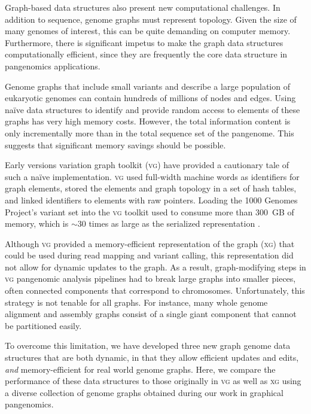 \documentclass{bioinfo}
\begin{document}
Graph-based data structures also present new computational challenges.
In addition to sequence, genome graphs must represent topology.
Given the size of many genomes of interest, this can be quite demanding on computer memory.
Furthermore, there is significant impetus to make the graph data structures computationally efficient, since they are frequently the core data structure in pangenomics applications.

Genome graphs that include small variants and describe a large population of eukaryotic genomes can contain hundreds of millions of nodes and edges.
Using na\"ive data structures to identify and provide random access to elements of these graphs has very high memory costs.
However, the total information content is only incrementally more than in the total sequence set of the pangenome.
This suggests that significant memory savings should be possible.

Early versions variation graph toolkit (\textsc{vg}) \citep{Garrison_2018} have provided a cautionary tale of such a na\"ive implementation.
\textsc{vg} used full-width machine words as identifiers for graph elements, stored the elements and graph topology in a set of hash tables, and linked identifiers to elements with raw pointers.
Loading the 1000 Genomes Project's variant set into the \textsc{vg} toolkit used to consume more than 300~GB of memory, which is $\sim$30 times as large as the serialized representation \citep{Garrison_2019}.

Although \textsc{vg} provided a memory-efficient representation of the graph (\textsc{xg}) that could be used during read mapping and variant calling, this representation did not allow for dynamic updates to the graph.
As a result, graph-modifying steps in \textsc{vg} pangenomic analysis pipelines had to break large graphs into smaller pieces, often connected components that correspond to chromosomes.
Unfortunately, this strategy is not tenable for all graphs.
For instance, many whole genome alignment and assembly graphs consist of a single giant component that cannot be partitioned easily.

To overcome this limitation, we have developed three new graph genome data structures that are both dynamic, in that they allow efficient updates and edits, \emph{and} memory-efficient for real world genome graphs.
Here, we compare the performance of these data structures to those originally in \textsc{vg} as well as \textsc{xg} using a diverse collection of genome graphs obtained during our work in graphical pangenomics.
\end{document}
